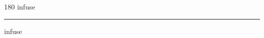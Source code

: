 
\begin{frame}
\begin{center}
\begin{turn}{180}
{\fontsize{2.5cm}{1em}\selectfont infuse}
\end{turn}
\vspace{1em}\par  
\hrule
\vspace{1em}\par  
{\fontsize{2.5cm}{1em}\selectfont infuse}
\end{center}
\end{frame}
